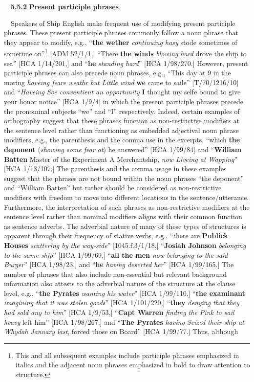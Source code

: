 \documentclass[12pt]{article}
\newenvironment{styleStandard}{\renewcommand\baselinestretch{1.0}\setlength\leftskip{0cm}\setlength\rightskip{0cm plus 1fil}\setlength\parindent{0cm}\setlength\parfillskip{0pt plus 1fil}\setlength\parskip{0in plus 1pt}\writerlistparindent\writerlistleftskip\leavevmode\normalfont\normalsize\writerlistlabel\ignorespaces}{\unskip\vspace{0in plus 1pt}\par}
\newcommand\writerlistleftskip{}
\newcommand\writerlistparindent{}
\newcommand\writerlistlabel{}
\begin{document}
\begin{styleStandard}
\ \ \textbf{5.5.2} \textbf{Present participle phrases }
\end{styleStandard}


\begin{styleStandard}
\ \ Speakers of Ship English make frequent use of modifying present participle phrases. These present participle phrases commonly follow a noun phrase that they appear to modify, e.g., “\textbf{the wether} \textit{continuing hasy} stode sometimes of sometime on”\footnote{ This and all subsequent examples include participle phrases emphasized in italics and the adjacent noun phrases emphasized in bold to draw attention to structure.} [ADM 52/1/1,] “There \textbf{the winds} \textit{blowing hard} drove the ship to sea” [HCA 1/14/201,] and “\textbf{he} \textit{standing hard}” [HCA 1/98/270.] However, present participle phrases can also precede noun phrases, e.g., “This day at 9 in the moring \textit{haveing feare weathr but Little wind }\textbf{we }came to saile” [T/70/1216/10] and “\textit{Haveing Soe conventient an opportunity}\textbf{ }\textbf{I} thought my selfe bound to give your honor notice” [HCA 1/9/4] in which the present participle phrases precede the pronominal subjects “we” and “I” respectively. Indeed, certain examples of orthography suggest that these phrases function as non-restrictive modifiers at the sentence level rather than functioning as embedded adjectival noun phrase modifiers, e.g., the parenthesis and the comma use in the excerpts, “which \textbf{the deponent} (\textit{showing some fear at}) he answered” [HCA 1/99/84] and “\textbf{William Batten} Master of the Experiment A Merchantship, \textit{now Liveing at Wapping}” [HCA 1/13/107.] The parenthesis and the comma usage in these examples suggest that the phrases are not bound within the noun phrases “the deponent” and “William Batten” but rather should be considered as non-restrictive modifiers with freedom to move into different locations in the sentence/utterance. Furthermore, the interpretation of such phrases as non-restrictive modifiers at the sentence level rather than nominal modifiers aligns with their common function as sentence adverbs. The adverbial nature of many of these types of structures is apparent through their frequency of stative verbs, e.g., “there are \textbf{Publick Houses} \textit{scattering by the way-side}” [1045.f.3/1/18,] “\textbf{Josiah Johnson} \textit{belonging to the same ship}” [HCA 1/99/69,] “\textbf{all the men} \textit{now belonging to the said Burger}” [HCA 1/98/23,] and “\textbf{he} \textit{having deserted her}” [HCA 1/99/165.] The number of phrases that also include non-essential but relevant background information also attests to the adverbial nature of the structure at the clause level, e.g., “\textbf{the Pyrates} \textit{wanting his water}” [HCA 1/99/110,] “\textbf{the examinant} \textit{imagining that it was stolen goods}” [HCA 1/101/220,] “\textbf{they} \textit{denying that they had sold any to him}” [HCA 1/9/53,] “\textbf{Capt Warren}\textit{ finding the Pink to sail heavy }left him” [HCA 1/98/267,] and “\textbf{The Pyrates} \textit{having Seized their ship at Whydah January last}, forced those on Board” [HCA 1/99/77.] Thus, although 
\end{styleStandard}
\end{document}
